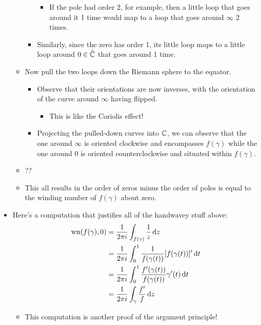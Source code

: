 \documentclass[../notes.tex]{subfiles}
\begin{document}
\begin{itemize}
\begin{itemize}
\begin{itemize}
\begin{itemize}
                \item If the pole had order 2, for example, then a little loop that goes around it 1 time would map to a loop that goes around $\infty$ 2 times.
            \end{itemize}
            \item Similarly, since the zero has order 1, its little loop maps to a little loop around $0\in\hat{\mathbb{C}}$ that goes around 1 time.
        \end{itemize}
        \item Now pull the two loops down the Riemann sphere to the equator.
        \begin{itemize}
            \item Observe that their orientations are now inverses, with the orientation of the curve around $\infty$ having flipped.
            \begin{itemize}
                \item This is like the Coriolis effect!
            \end{itemize}
            \item Projecting the pulled-down curves into $\mathbb{C}$, we can observe that the one around $\infty$ is oriented clockwise and encompasses $f(\gamma)$ while the one around 0 is oriented counterclockwise and situated within $f(\gamma)$.
        \end{itemize}
        \item ??
        \item This all results in the order of zeros minus the order of poles is equal to the winding number of $f(\gamma)$ about zero.
    \end{itemize}
    \item Here's a computation that justifies all of the handwavey stuff above:
    \begin{align*}
        \operatorname{wn}(f(\gamma),0) &= \frac{1}{2\pi i}\int_{f(\gamma)}\frac{1}{z}\dd{z}\\
        &= \frac{1}{2\pi i}\int_0^1\frac{1}{f(\gamma(t))}[f(\gamma(t))]'\dd{t}\\
        &= \frac{1}{2\pi i}\int_0^1\frac{f'(\gamma(t))}{f(\gamma(t))}\gamma'(t)\dd{t}\\
        &= \frac{1}{2\pi i}\int_\gamma\frac{f'}{f}\dd{z}
    \end{align*}
    \begin{itemize}
        \item This computation is another proof of the argument principle!
    \end{itemize}

\end{itemize}
\end{document}
